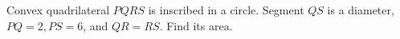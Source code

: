 Convex quadrilateral $ PQRS $ is inscribed in a circle. Segment $ QS $ is a diameter, $ PQ=2,PS=6 $, and $ QR=RS $. Find its area.
